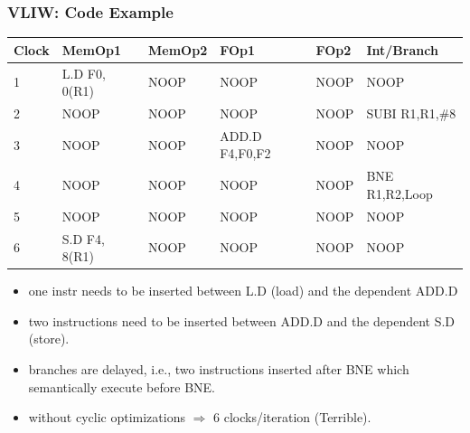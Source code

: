 \documentclass{beamer}
\begin{document}
\begin{frame}[fragile,t]
    \frametitle{VLIW: Code Example}


\begin{tiny}
\begin{tabular}{llllll}
\hline
Clock   & MemOp1          & MemOp2 & FOp1  & FOp2 & Int/Branch    \\\hline
1       & L.D   F0, 0(R1) & NOOP   & NOOP  & NOOP & NOOP \\
2       & NOOP            & NOOP   & NOOP  & NOOP & SUBI R1,R1,\#8\\
3       & NOOP            & NOOP   & ADD.D F4,F0,F2  & NOOP & NOOP\\
4       & NOOP            & NOOP   & NOOP  & NOOP & BNE R1,R2,Loop\\
5       & NOOP            & NOOP   & NOOP  & NOOP & NOOP\\
6       & S.D F4, 8(R1)   & NOOP   & NOOP  & NOOP & NOOP\\\hline
\end{tabular}
\end{tiny}

\smallskip

\begin{itemize}
    \item one instr needs to be inserted between L.D (load)
            and the dependent ADD.D
    \item two instructions need to be inserted between ADD.D
            and the dependent S.D (store).
    \item branches are delayed, i.e., two instructions inserted
            after BNE which semantically execute before BNE.
    \item without cyclic optimizations $\Rightarrow$ \alert{6 clocks/iteration (Terrible)}.
\end  {itemize}

\end{frame}
\end{document}
